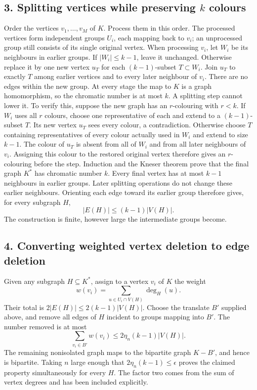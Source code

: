 \subsection*{3. Splitting vertices while preserving $k$ colours}
Order the vertices $v_1,\ldots,v_M$ of $K$. Process them in this order. The processed vertices form independent groups $U_i$, each mapping back to $v_i$; an unprocessed group still consists of its single original vertex. When processing $v_i$, let $W_i$ be its neighbours in earlier groups. If $|W_i|\le k-1$, leave it unchanged. Otherwise replace it by one new vertex $u_T$ for each $(k-1)$-subset $T\subset W_i$. Join $u_T$ to exactly $T$ among earlier vertices and to every later neighbour of $v_i$. There are no edges within the new group.
At every stage the map to $K$ is a graph homomorphism, so the chromatic number is at most $k$. A splitting step cannot lower it. To verify this, suppose the new graph has an $r$-colouring with $r<k$. If $W_i$ uses all $r$ colours, choose one representative of each and extend to a $(k-1)$-subset $T$. Its new vertex $u_T$ sees every colour, a contradiction. Otherwise choose $T$ containing representatives of every colour actually used in $W_i$ and extend to size $k-1$. The colour of $u_T$ is absent from all of $W_i$ and from all later neighbours of $v_i$. Assigning this colour to the restored original vertex therefore gives an $r$-colouring before the step. Induction and the Kneser theorem prove that the final graph $K^*$ has chromatic number $k$.
Every final vertex has at most $k-1$ neighbours in earlier groups. Later splitting operations do not change these earlier neighbours. Orienting each edge toward its earlier group therefore gives, for every subgraph $H$,
\[
 |E(H)|\le(k-1)|V(H)|.
\]
The construction is finite, however large the intermediate groups become.

\subsection*{4. Converting weighted vertex deletion to edge deletion}
Given any subgraph $H\subseteq K^*$, assign to a vertex $v_i$ of $K$ the weight
\[
 w(v_i)=\sum_{u\in U_i\cap V(H)}\deg_H(u).
\]
Their total is $2|E(H)|\le2(k-1)|V(H)|$. Choose the translate $B'$ supplied above, and remove all edges of $H$ incident to groups mapping into $B'$. The number removed is at most
\[
 \sum_{v_i\in B'}w(v_i)\le2\eta_n(k-1)|V(H)|.
\]
The remaining nonisolated graph maps to the bipartite graph $K-B'$, and hence is bipartite. Taking $n$ large enough that $2\eta_n(k-1)\le\epsilon$ proves the claimed property simultaneously for every $H$. The factor two comes from the sum of vertex degrees and has been included explicitly.

